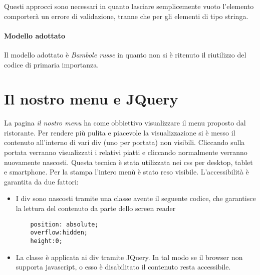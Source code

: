 Questi approcci sono necessari in quanto lasciare semplicemente vuoto l'elemento comporterà un errore di validazione, tranne che per gli elementi di tipo stringa.

\paragraph{Modello adottato}
Il modello adottato è \emph{Bambole russe} in quanto non si è ritenuto il riutilizzo del codice di primaria importanza.

\section{Il nostro menu e JQuery}
La pagina \emph{il nostro menu} ha come obbiettivo visualizzare il menu proposto dal ristorante. 
Per rendere più pulita e piacevole la visualizzazione si è messo il contenuto all'interno di vari div (uno per portata) non visibili.
Cliccando sulla portata verranno visualizzati i relativi piatti e cliccando normalmente verranno nuovamente nascosti.
Questa tecnica è stata utilizzata nei css per desktop, tablet e smartphone. 
Per la stampa l'intero menù è stato reso visibile.
L'accessibilità è garantita da due fattori:
\begin{itemize}
\item I div sono nascosti tramite una classe avente il seguente codice, che garantisce la lettura del contenuto da parte dello screen reader
\begin{lstlisting}
	position: absolute; 
	overflow:hidden; 
	height:0;
\end{lstlisting}
\item La classe è applicata ai div tramite JQuery. In tal modo se il browser non supporta javascript, o esso è disabilitato il contenuto resta accessibile.
\end{itemize}